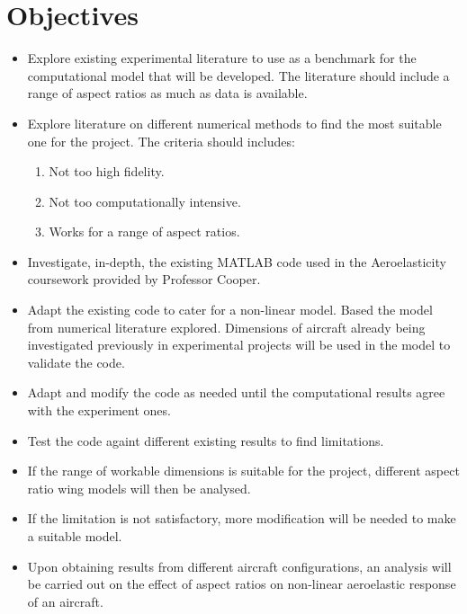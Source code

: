 \documentclass[11pt]{article}
\begin{document}
\section*{Objectives} 
\begin{itemize}
    \item Explore existing experimental literature to use as a benchmark for the computational model that will be developed. The literature should include a range of aspect ratios as much as data is available.
    \item Explore literature on different numerical methods to find the most suitable one for the project. The criteria should includes:
    \begin{enumerate}
        \item Not too high fidelity.
        \item Not too computationally intensive.
        \item Works for a range of aspect ratios.
    \end{enumerate}
    \item Investigate, in-depth, the existing MATLAB code used in the Aeroelasticity coursework provided by Professor Cooper.
    \item Adapt the existing code to cater for a non-linear model. Based the model from numerical literature explored. Dimensions of aircraft already being investigated previously in experimental projects will be used in the model to validate the code.
   \item Adapt and modify the code as needed until the computational results agree with the experiment ones.
    \item Test the code againt different existing results to find limitations.
    \item If the range of workable dimensions is suitable for the project, different aspect ratio wing models will then be analysed.
    \item If the limitation is not satisfactory, more modification will be needed to make a suitable model.
    \item Upon obtaining results from different aircraft configurations, an analysis will be carried out on the effect of aspect ratios on non-linear aeroelastic response of an aircraft.
    
\end{itemize}


\end{document}
